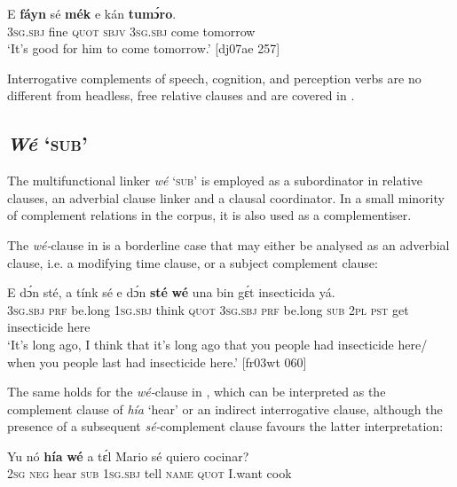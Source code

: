 \ea%
    \label{ex:key:1411}
    \gll E    \textbf{fáyn}  sé    \textbf{mék}   e    kán    \textbf{tumɔ́ro}.\\
\textsc{3sg.sbj}  fine    \textsc{quot}    \textsc{sbjv}    \textsc{3sg.sbj}  come  tomorrow\\

\glt ‘It’s good for him to come tomorrow.’ [dj07ae 257]
\z

Interrogative complements of speech, cognition, and perception verbs are no different from headless, free relative clauses and are covered in . 

\subsection{\textit{Wé} ‘\textsc{sub}’}

The multifunctional linker \textit{wé} ‘\textsc{sub’} is employed as a subordinator in relative clauses, an adverbial clause linker and a clausal coordinator. In a small minority of complement relations in the corpus, it is also used as a complementiser. 


The \textit{wé-}clause in  is a borderline case that may either be analysed as an adverbial clause, i.e. a modifying time clause, or a subject complement clause:



\ea%
    \label{ex:key:1412}
    \gll E    dɔ́n  sté,    a    tínk    sé    e    dɔ́n  \textbf{sté}
\textbf{wé}  una  bin  gɛ́t  insecticida  yá.\\
\textsc{3sg.sbj}  \textsc{prf}  be.long  \textsc{1sg.sbj}  think  \textsc{quot}    \textsc{3sg.sbj}  \textsc{prf}  be.long
\textsc{sub}  \textsc{2pl}  \textsc{pst}  get  insecticide  here\\

\glt ‘It’s long ago, I think that it’s long ago that you people had insecticide here/
when you people last had insecticide here.’ [fr03wt 060]
\z

The same holds for the \textit{wé-}clause in , which can be interpreted as the complement clause of \textit{hía} ‘hear’ or an indirect interrogative clause, although the presence of a subsequent \textit{sé-}complement clause favours the latter interpretation: 


\ea%
    \label{ex:key:1413}
    \gll Yu  nó  \textbf{hía}  \textbf{wé}  a    tɛ́l  Mario  sé    quiero  cocinar?\\
\textsc{2sg}  \textsc{neg}  hear  \textsc{sub}  \textsc{1sg.sbj}  tell  \textsc{name}  \textsc{quot}    I.want  cook\\

